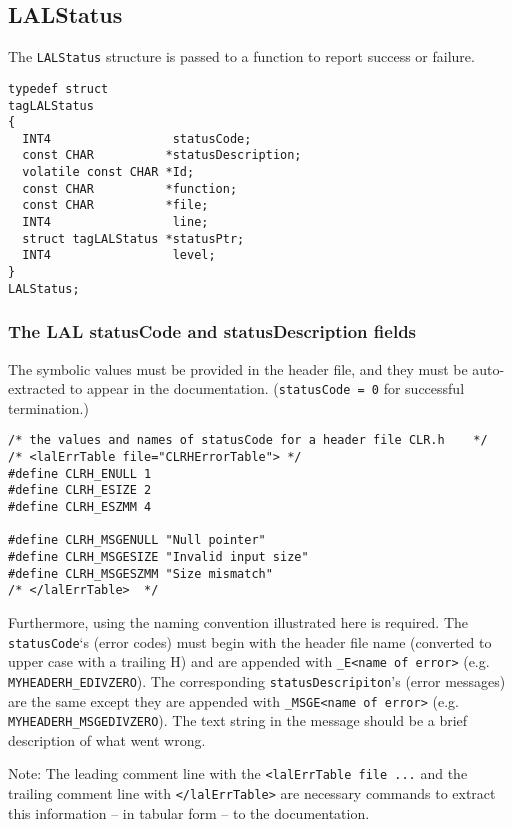 \documentclass[]{ligodcc}
\renewcommand{\texttt}[1]{{\ttfamily\color{blue}#1}}
\begin{document}
\subsection{ {\texttt {LALStatus}}}
\label{ssec:lalstatus}

The {\tt LALStatus} structure is passed to a function to report
success or failure.
{\footnotesize
\begin{verbatim}
typedef struct
tagLALStatus
{
  INT4                 statusCode;
  const CHAR          *statusDescription;
  volatile const CHAR *Id;
  const CHAR          *function;
  const CHAR          *file;
  INT4                 line;
  struct tagLALStatus *statusPtr;
  INT4                 level;
}
LALStatus;
\end{verbatim}}

\subsubsection{The LAL {\texttt {statusCode}} and 
{\texttt {statusDescription}} fields }

 The symbolic values must be provided in the header file, and they
must  be auto-extracted to appear in the documentation.  
({\tt statusCode = 0} for successful termination.)

{\footnotesize
\begin{verbatim}
/* the values and names of statusCode for a header file CLR.h    */
/* <lalErrTable file="CLRHErrorTable"> */
#define CLRH_ENULL 1
#define CLRH_ESIZE 2
#define CLRH_ESZMM 4
  
#define CLRH_MSGENULL "Null pointer"
#define CLRH_MSGESIZE "Invalid input size"
#define CLRH_MSGESZMM "Size mismatch"
/* </lalErrTable>  */
\end{verbatim}}

Furthermore, using the naming convention illustrated here is required.
The  {\tt statusCode}`s (error codes) must begin with the header file name
(converted to upper case with a trailing H)  and are appended with
{\tt \_E<name of error>} (e.g. {\tt MYHEADERH\_EDIVZERO}). The
corresponding {\tt statusDescripiton}'s (error messages) are the same
except they are appended with {\tt \_MSGE<name of error>} (e.g. {\tt
MYHEADERH\_MSGEDIVZERO}).  The text string in the message should be a
brief description of what went wrong.

Note: The leading comment line with the {\tt <lalErrTable file ...}
and the trailing comment line with {\tt </lalErrTable>} are necessary
commands to extract this information -- in tabular form -- to the
documentation.
\end{document}
